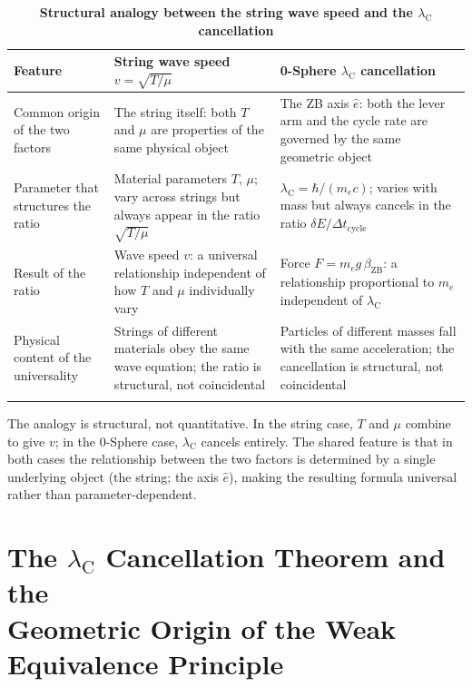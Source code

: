 \documentclass[%
 reprint, amsmath,amssymb, aps, prb, ]{revtex4-2}
\numberwithin{equation}{section}
\newcommand{\lambdaC}{\lambda_{\mathrm{C}}}
\newcommand{\betaZB}{\beta_{\mathrm{ZB}}}
\begin{document}
\begin{table}[t!]
\centering
\caption{\textbf{Structural analogy between the string wave speed and the $\lambdaC$ cancellation}}
\label{tab:analogy}
\renewcommand{\arraystretch}{1.4}
\begin{tabular}{p{3.5cm}p{5.5cm}p{6.5cm}}
\toprule
\textbf{Feature} & \textbf{String wave speed $v = \sqrt{T/\mu}$} & \textbf{0-Sphere $\lambdaC$ cancellation} \\
\midrule
Common origin of the two factors
& The string itself: both $T$ and $\mu$ are properties of the same physical object
& The ZB axis $\hat{e}$: both the lever arm and the cycle rate are governed by the same geometric object \\
\addlinespace[0.3cm]
Parameter that structures the ratio
& Material parameters $T$, $\mu$; vary across strings but always appear in the ratio $\sqrt{T/\mu}$
& $\lambdaC = \hbar/(m_e c)$; varies with mass but always cancels in the ratio $\delta E / \Delta t_\mathrm{cycle}$ \\
\addlinespace[0.3cm]
Result of the ratio
& Wave speed $v$: a universal relationship independent of how $T$ and $\mu$ individually vary
& Force $F = m_e g\,\betaZB$: a relationship proportional to $m_e$ independent of $\lambdaC$ \\
\addlinespace[0.3cm]
Physical content of the universality
& Strings of different materials obey the same wave equation; the ratio is structural, not coincidental
& Particles of different masses fall with the same acceleration; the cancellation is structural, not coincidental \\
\addlinespace[0.2cm]
\bottomrule
\end{tabular}
\vspace{0.2cm}
\begin{minipage}{0.95\textwidth}
\justifying\footnotesize
The analogy is structural, not quantitative. In the string case, $T$ and $\mu$ combine to give $v$; in the 0-Sphere case, $\lambdaC$ cancels entirely. The shared feature is that in both cases the relationship between the two factors is determined by a single underlying object (the string; the axis $\hat{e}$), making the resulting formula universal rather than parameter-dependent.
\end{minipage}
\end{table}

\section{The $\lambdaC$ Cancellation Theorem and the\\Geometric Origin of the Weak Equivalence Principle}
\label{sec:cancel}
\end{document}
